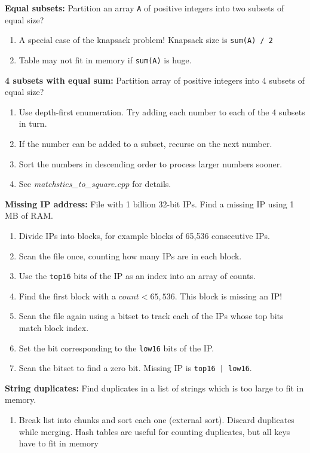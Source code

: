 \documentclass[12pt]{article}
\begin{document}
\vspace{5mm}
\noindent
\textbf{Equal subsets:}
Partition an array \texttt{A} of positive integers into two subsets of equal size?
\begin{enumerate}
\item A special case of the knapsack problem! Knapsack size is \texttt{sum(A) / 2}
\item Table may not fit in memory if \texttt{sum(A)} is huge.
\end{enumerate}


\vspace{5mm}
\noindent
\textbf{4 subsets with equal sum:}
Partition array of positive integers into 4 subsets of equal size?
\begin{enumerate}
\item Use depth-first enumeration. Try adding each number to each of the 4 subsets in turn.
\item If the number can be added to a subset, recurse on the next number.
\item Sort the numbers in descending order to process larger numbers sooner.
\item See \emph{matchstics\_to\_square.cpp} for details. 
\end{enumerate}


\vspace{5mm}
\noindent
\textbf{Missing IP address:}
File with 1 billion 32-bit IPs. Find a missing IP using 1 MB of RAM.
\begin{enumerate}
\item Divide IPs into blocks, for example blocks of 65,536 consecutive IPs.
\item Scan the file once, counting how many IPs are in each block. 
\item Use the \texttt{top16} bits of the IP as an index into an array of counts.
\item Find the first block with a $count < 65,536$. This block is missing an IP!
\item Scan the file again using a bitset to track each of the IPs whose top bits match block index.
\item Set the bit corresponding to the \texttt{low16} bits of the IP.
\item Scan the bitset to find a zero bit. Missing IP is \texttt{top16 | low16}.
\end{enumerate}


\vspace{5mm}
\noindent
\textbf{String duplicates:}
Find duplicates in a list of strings which is too large to fit in memory.
\begin{enumerate}
\item Break list into chunks and sort each one (external sort). Discard duplicates while merging. 
Hash tables are useful for counting duplicates, but all keys have to fit in memory
\end{enumerate}
\end{document}
